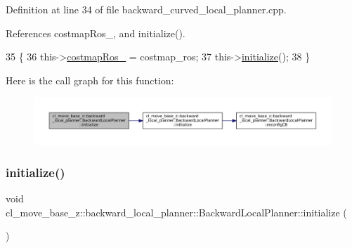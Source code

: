 Definition at line 34 of file backward\+\_\+curved\+\_\+local\+\_\+planner.\+cpp.



References costmap\+Ros\+\_\+, and initialize().


\begin{DoxyCode}
35         \{
36             this->\hyperlink{classcl__move__base__z_1_1backward__local__planner_1_1BackwardLocalPlanner_a4136268882a105d9e06e173d85d5c0dc}{costmapRos\_} = costmap\_ros;
37             this->\hyperlink{classcl__move__base__z_1_1backward__local__planner_1_1BackwardLocalPlanner_a5c9815019cef272faed835cd8c575196}{initialize}();
38         \}
\end{DoxyCode}
Here is the call graph for this function\+:
\nopagebreak
\begin{figure}[H]
\begin{center}
\leavevmode
\includegraphics[width=350pt]{classcl__move__base__z_1_1backward__local__planner_1_1BackwardLocalPlanner_a9a854ad7d93c5db2efda316358aa845c_cgraph}
\end{center}
\end{figure}
\mbox{\label{classcl__move__base__z_1_1backward__local__planner_1_1BackwardLocalPlanner_a5c9815019cef272faed835cd8c575196}} 
\subsubsection{\texorpdfstring{initialize()}{initialize()}\hspace{0.1cm}{\footnotesize\ttfamily [3/3]}}
{\footnotesize\ttfamily void cl\+\_\+move\+\_\+base\+\_\+z\+::backward\+\_\+local\+\_\+planner\+::\+Backward\+Local\+Planner\+::initialize (\begin{DoxyParamCaption}{ }\end{DoxyParamCaption})}



